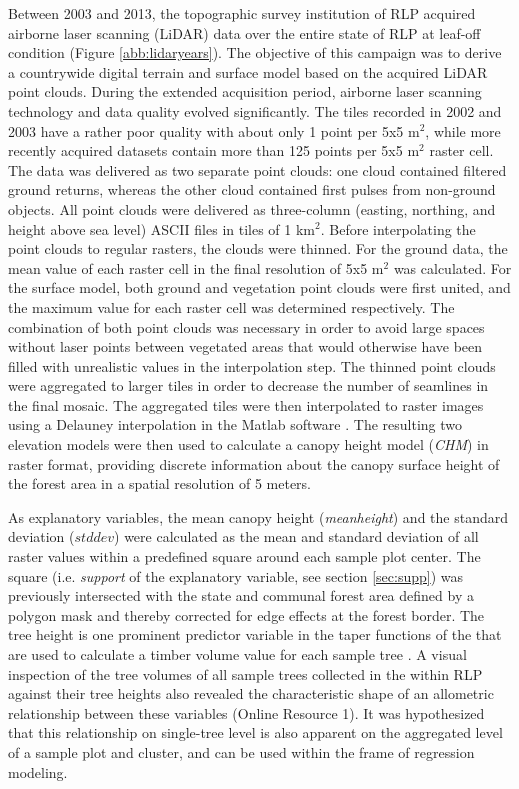 Between 2003 and 2013, the topographic survey institution of RLP acquired airborne laser scanning (LiDAR) data over the entire state of RLP at leaf-off condition (Figure \ref{abb:lidaryears}). The objective of this campaign was to derive a countrywide digital terrain and surface model based on the acquired LiDAR point clouds. During the extended acquisition period, airborne laser scanning technology and data quality evolved significantly. The tiles recorded in 2002 and 2003 have a rather poor quality with about only 1 point per 5x5 m$^2$, while more recently acquired datasets contain more than 125 points per 5x5 m$^2$ raster cell. The data was delivered as two separate point clouds: one cloud contained filtered ground returns, whereas the other cloud contained first pulses from non-ground objects. All point clouds were delivered as three-column (easting, northing, and height above sea level) ASCII files in tiles of 1 km$^2$. Before interpolating the point clouds to regular rasters, the clouds were thinned. For the ground data, the mean value of each raster cell in the final resolution of 5x5 m$^2$ was calculated. For the surface model, both ground and vegetation point clouds were first united, and the maximum value for each raster cell was determined respectively. The combination of both point clouds was necessary in order to avoid large spaces without laser points between vegetated areas that would otherwise have been filled with unrealistic values in the interpolation step. The thinned point clouds were aggregated to larger tiles in order to decrease the number of seamlines in the final mosaic. The aggregated tiles were then interpolated to raster images using a Delauney interpolation in the Matlab software \citep{matlab}. The resulting two elevation models were then used to calculate a canopy height model (\textit{CHM}) in raster format, providing discrete information about the canopy surface height of the forest area in a spatial resolution of 5 meters.\par 
As explanatory variables, the mean canopy height (\textit{meanheight}) and the standard deviation ($stddev$) were calculated as the mean and standard deviation of all raster values within a predefined square around each sample plot center. The square (i.e. \textit{support} of the explanatory variable, see section \ref{sec:supp}) was previously intersected with the state and communal forest area defined by a polygon mask and thereby corrected for edge effects at the forest border. The tree height is one prominent predictor variable in the taper functions of the \bwi{} that are used to calculate a timber volume value for each sample tree \citep{kublin2003, kublin2013}. A visual inspection of the tree volumes of all sample trees collected in the \bwi{} within RLP against their tree heights also revealed the characteristic shape of an allometric relationship between these variables (Online Resource 1). It was hypothesized that this relationship on single-tree level is also apparent on the aggregated level of a sample plot and cluster, and can be used within the frame of regression modeling.\par
